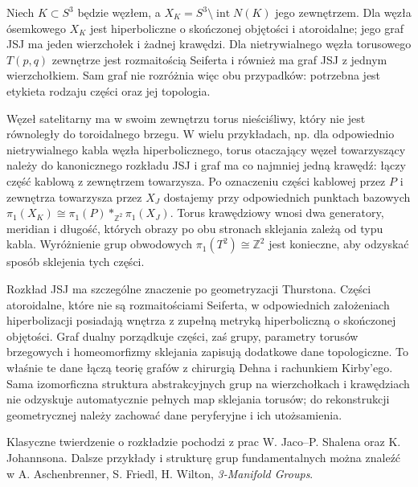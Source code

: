 \begin{przyklad}
Niech $K\subset S^3$ będzie węzłem, a
$X_K=S^3\setminus\operatorname{int}N(K)$ jego
zewnętrzem. Dla węzła ósemkowego $X_K$ jest
hiperboliczne o skończonej objętości i atoroidalne;
jego graf JSJ ma jeden wierzchołek i żadnej krawędzi.
Dla nietrywialnego węzła torusowego $T(p,q)$
zewnętrze jest rozmaitością Seiferta i również
ma graf JSJ z jednym wierzchołkiem. Sam graf nie
rozróżnia więc obu przypadków: potrzebna jest
etykieta rodzaju części oraz jej topologia.

Węzeł satelitarny ma w swoim zewnętrzu torus nieściśliwy,
który nie jest równoległy do toroidalnego brzegu.
W wielu przykładach, np. dla odpowiednio
nietrywialnego kabla węzła hiperbolicznego,
torus otaczający węzeł towarzyszący należy do
kanonicznego rozkładu JSJ i graf ma co najmniej jedną
krawędź: łączy część kablową z zewnętrzem
towarzysza. Po oznaczeniu części kablowej przez $P$
i zewnętrza towarzysza przez $X_J$ dostajemy przy
odpowiednich punktach bazowych
$\pi_1(X_K)\cong\pi_1(P)*_{\mathbb Z^2}\pi_1(X_J)$.
Torus krawędziowy wnosi dwa generatory, meridian i długość,
których obrazy po obu stronach sklejania zależą od typu kabla. Wyróżnienie grup obwodowych
$\pi_1(T^2)\cong\mathbb Z^2$ jest konieczne,
aby odzyskać sposób sklejenia tych części.
\end{przyklad}

\begin{uwaga}
Rozkład JSJ ma szczególne znaczenie po
geometryzacji Thurstona. Części atoroidalne,
które nie są rozmaitościami Seiferta, w
odpowiednich założeniach hiperbolizacji
posiadają wnętrza z zupełną metryką
hiperboliczną o skończonej objętości.
Graf dualny porządkuje części, zaś grupy,
parametry torusów brzegowych i homeomorfizmy
sklejania zapisują dodatkowe dane topologiczne.
To właśnie te dane łączą teorię grafów z
chirurgią Dehna i rachunkiem Kirby'ego. Sama
izomorficzna struktura abstrakcyjnych grup na wierzchołkach
i krawędziach nie odzyskuje automatycznie pełnych map
sklejania torusów; do rekonstrukcji geometrycznej
należy zachować dane peryferyjne i ich utożsamienia.
\end{uwaga}

\begin{uwaga}[Literatura]
Klasyczne twierdzenie o rozkładzie pochodzi z prac
W. Jaco--P. Shalena oraz K. Johannsona.
Dalsze przykłady i strukturę grup fundamentalnych
można znaleźć w A. Aschenbrenner,
S. Friedl, H. Wilton, \emph{3-Manifold Groups}.
\end{uwaga}


